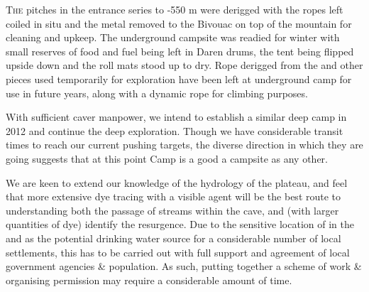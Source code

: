 \thispagestyle{endchapter}

\begin{tcolorbox}
\vspace{80pt}

\lettrine{T}{he} pitches in the entrance series to -550 m were derigged with the
ropes left coiled in situ and the metal removed to the Bivouac on top of
the mountain for cleaning and upkeep. The underground campsite was
readied for winter with small reserves of food and fuel being left in
Daren drums, the tent being flipped upside down and the roll mats stood
up to dry. Rope derigged from the  and other pieces
used temporarily for exploration have been left at underground camp for
use in future years, along with a dynamic rope for climbing purposes.

With sufficient caver manpower, we intend to establish a similar deep
camp in 2012 and continue the deep exploration. Though we have
considerable transit times to reach our current pushing targets, the
diverse direction in which they are going suggests that at this point
Camp  is a good a campsite as any other.

We are keen to extend our knowledge of the hydrology of the plateau, and
feel that more extensive dye tracing with a visible agent will be the
best route to understanding both the passage of streams within the cave,
and (with larger quantities of dye) identify the resurgence. Due to the
sensitive location of  in the  and as the
potential drinking water source for a considerable number of local
settlements, this has to be carried out with full support and agreement
of local government agencies \& population. As such, putting together a
scheme of work \& organising permission may require a considerable
amount of time.


\end{tcolorbox}
